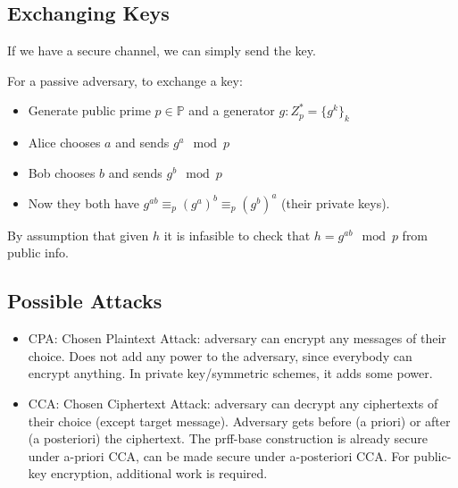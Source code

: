 \subsection{Exchanging Keys}

If we have a secure channel, we can simply send the key.

\begin{algorithm}
	For a passive adversary, to exchange a key:
	\begin{itemize}
		\item Generate public prime $p \in \mathbb{P}$ and a generator $g \colon Z_{p}^{*} = \{g^{k}\}_{k} $ 
		\item Alice chooses $a$ and sends  $g^{a} \mod p$
		\item Bob chooses $b$ and sends  $g^{b} \mod p$
		\item Now they both have $g^{ab} \equiv_p (g^{a})^{b} \equiv_p (g^{b})^{a}$ (their private keys).
	\end{itemize}
	By assumption that given $h$ it is infasible to check that  $h = g^{ab} \mod p$ from public info.
\end{algorithm}

\subsection{Possible Attacks}

\begin{itemize}
	\item CPA: Chosen Plaintext Attack: adversary can encrypt any messages of their choice.
		Does not add any power to the adversary, since everybody can encrypt anything.
		In private key/symmetric schemes, it adds some power.

	\item CCA: Chosen Ciphertext Attack: adversary can decrypt any ciphertexts of their choice (except target message).
		Adversary gets before (a priori) or after (a posteriori) the ciphertext.
		The prff-base construction is already secure under a-priori CCA, can be made secure under a-posteriori CCA.
		For public-key encryption, additional work is required.
\end{itemize}
